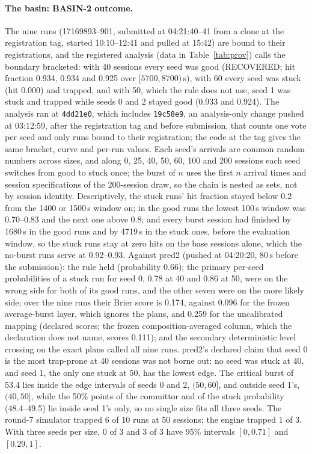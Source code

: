 \paragraph{The basin: BASIN-2 outcome.} The nine runs (17169893--901, submitted at 04:21:40--41 from a clone at the registration tag, started 10:10--12:41 and pulled at 15:42) are bound to their registrations, and the registered analysis (data in Table~\ref{tab:prov}) calls the boundary bracketed: with 40 sessions every seed was good (RECOVERED; hit fraction 0.934, 0.934 and 0.925 over $[5700,8700)$\,s), with 60 every seed was stuck (hit 0.000) and trapped, and with 50, which the rule does not use, seed 1 was stuck and trapped while seeds 0 and 2 stayed good (0.933 and 0.924). The analysis ran at \texttt{4dd21e0}, which includes \texttt{19c58e9}, an analysis-only change pushed at 03:12:59, after the registration tag and before submission, that counts one vote per seed and only runs bound to their registration; the code at the tag gives the same bracket, curve and per-run values. Each seed's arrivals are common random numbers across sizes, and along 0, 25, 40, 50, 60, 100 and 200 sessions each seed switches from good to stuck once; the burst of $n$ uses the first $n$ arrival times and session specifications of the 200-session draw, so the chain is nested as sets, not by session identity. Descriptively, the stuck runs' hit fraction stayed below 0.2 from the 1400 or 1500\,s window on; in the good runs the lowest 100\,s window was 0.70--0.83 and the next one above 0.8; and every burst session had finished by 1680\,s in the good runs and by 4719\,s in the stuck ones, before the evaluation window, so the stuck runs stay at zero hits on the base sessions alone, which the no-burst runs serve at 0.92--0.93. Against pred2 (pushed at 04:20:20, 80\,s before the submission): the rule held (probability 0.66); the primary per-seed probabilities of a stuck run for seed 0, 0.78 at 40 and 0.86 at 50, were on the wrong side for both of its good runs, and the other seven were on the more likely side; over the nine runs their Brier score is 0.174, against 0.096 for the frozen average-burst layer, which ignores the plans, and 0.259 for the uncalibrated mapping (declared scores; the frozen composition-averaged column, which the declaration does not name, scores 0.111); and the secondary deterministic level crossing on the exact plans called all nine runs. pred2's declared claim that seed 0 is the most trap-prone at 40 sessions was not borne out: no seed was stuck at 40, and seed 1, the only one stuck at 50, has the lowest edge. The critical burst of 53.4 lies inside the edge intervals of seeds 0 and 2, $(50,60]$, and outside seed 1's, $(40,50]$, while the 50\% points of the committor and of the stuck probability (48.4--49.5) lie inside seed 1's only, so no single size fits all three seeds. The round-7 simulator trapped 6 of 10 runs at 50 sessions; the engine trapped 1 of 3. With three seeds per size, 0 of 3 and 3 of 3 have 95\% intervals $[0,0.71]$ and $[0.29,1]$.

